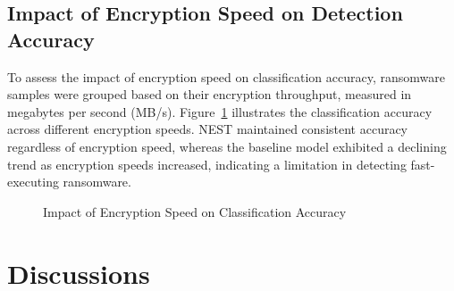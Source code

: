 \documentclass[lettersize,journal]{IEEEtran}
\begin{document}
\subsection{Impact of Encryption Speed on Detection Accuracy}

To assess the impact of encryption speed on classification accuracy, ransomware samples were grouped based on their encryption throughput, measured in megabytes per second (MB/s). Figure~\ref{fig:encryption_speed} illustrates the classification accuracy across different encryption speeds. NEST maintained consistent accuracy regardless of encryption speed, whereas the baseline model exhibited a declining trend as encryption speeds increased, indicating a limitation in detecting fast-executing ransomware.

\begin{figure}[h]
	\centering
	\caption{Impact of Encryption Speed on Classification Accuracy}
	\label{fig:encryption_speed}
\end{figure}


\section{Discussions}
\end{document}

